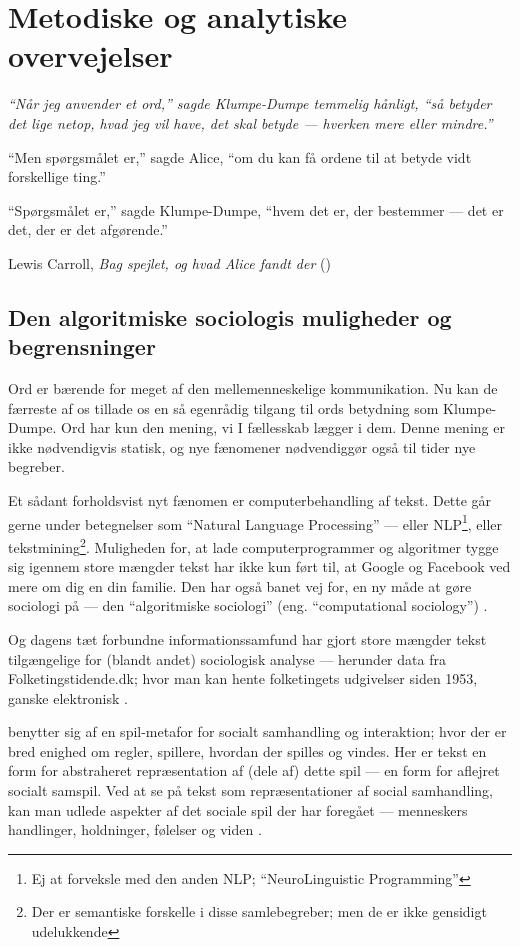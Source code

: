 \part{Metodiske og analytiske overvejelser}\label{part:method}

\epigraph{\itshape
“Når jeg anvender et ord,” sagde Klumpe-Dumpe temmelig hånligt, “så betyder det lige netop, hvad jeg vil have, det skal betyde — hverken mere eller mindre.”

“Men spørgsmålet er,” sagde Alice, “om du kan få ordene til at betyde vidt forskellige ting.”

“Spørgsmålet er,” sagde Klumpe-Dumpe, “hvem det er, der bestemmer — det er det, der er det afgørende.”
}{Lewis Carroll, \textit{Bag spejlet, og hvad Alice fandt der} (\citeyear{carrollAliceEventyrlandOg1977})}

\chapter{Den algoritmiske sociologis muligheder og begrensninger}

Ord er bærende for meget af den mellemenneskelige kommunikation.
Nu kan de færreste af os tillade os en så egenrådig tilgang til ords betydning som Klumpe-Dumpe.
Ord har kun den mening, vi I fællesskab lægger i dem.
Denne mening er ikke nødvendigvis statisk, og nye fænomener nødvendiggør også til tider nye begreber.

Et sådant forholdsvist nyt fænomen er computerbehandling af tekst.
Dette går gerne under betegnelser som “Natural Language Processing” — eller NLP\footnote{Ej at forveksle med den anden NLP; “NeuroLinguistic Programming”}, eller tekstmining\footnote{Der er semantiske forskelle i disse samlebegreber; men de er ikke gensidigt udelukkende}.
Muligheden for, at lade computerprogrammer og algoritmer tygge sig igennem store mængder tekst har ikke kun ført til, at Google og Facebook ved mere om dig en din familie.
Den har også banet vej for, en ny måde at gøre sociologi på — den “algoritmiske sociologi” (eng. “computational sociology”) \autocite{evansComputationSociologicalImagination2019}.

Og dagens tæt forbundne informationssamfund har gjort store mængder tekst tilgængelige for (blandt andet) sociologisk analyse --- herunder data fra Folketingstidende.dk; hvor man kan hente folketingets udgivelser siden 1953, ganske elektronisk \autocite{folketingstidendeOmFolketingstidende}.

\citeauthor{evansMachineTranslationMining2016} benytter sig af en spil-metafor for socialt samhandling og interaktion; hvor der er bred enighed om regler, spillere, hvordan der spilles og vindes.
Her er tekst en form for abstraheret repræsentation af (dele af) dette spil --- en form for aflejret socialt samspil.
Ved at se på tekst som repræsentationer af social samhandling, kan man udlede aspekter af det sociale spil der har foregået — menneskers handlinger, holdninger, følelser og viden \autocite[s. 22]{evansMachineTranslationMining2016}.

